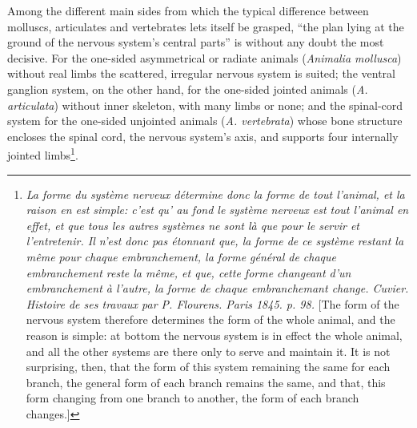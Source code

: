 \documentclass[12pt,a4paper]{book}
\begin{document}
Among the different main sides from which the typical difference between molluscs,
articulates and vertebrates lets itself be grasped, ``the plan lying at the ground of
the nervous system's central parts'' is without any doubt the most decisive. For the
one-sided asymmetrical or radiate animals (\textit{Animalia mollusca}) without real
limbs the scattered, irregular nervous system is suited; the ventral ganglion system,
on the other hand, for the one-sided jointed animals (\textit{A. articulata}) without
inner skeleton, with many limbs or none; and the spinal-cord system for the one-sided
unjointed animals (\textit{A. vertebrata}) whose bone structure encloses the spinal
cord, the nervous system's axis, and supports four internally jointed
limbs\footnote{\textit{La forme du système nerveux détermine donc la forme de tout
l'animal, et la raison en est simple: c'est qu' au fond le système nerveux est tout
l'animal en effet, et que tous les autres systèmes ne sont là que pour le servir et
l'entretenir. Il n'est donc pas étonnant que, la forme de ce système restant la même
pour chaque \emph{embranchement}, la forme général de chaque \emph{embranchement}
reste la même, et que, cette forme changeant d'un \emph{embranchement} à l'autre, la
forme de chaque \emph{embranchemant} change. \emph{Cuvier}. Histoire de ses travaux
par P. Flourens. Paris 1845. p. 98.} [The form of the nervous system therefore
determines the form of the whole animal, and the reason is simple: at bottom the
nervous system is in effect the whole animal, and all the other systems are there
only to serve and maintain it. It is not surprising, then, that the form of this
system remaining the same for each branch, the general form of each branch remains
the same, and that, this form changing from one branch to another, the form of each
branch changes.]}.
\end{document}
